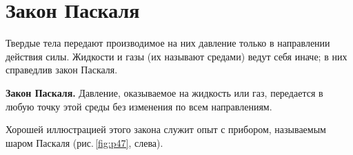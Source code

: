 \documentclass[main.tex]{subfiles}
\begin{document}

\pagestyle{empty}

 

\setcounter{section}{26
}
\addtocounter{section}{-1} 

\section{Закон Паскаля}


Твердые тела передают производимое на них давление только в направлении действия силы. Жидкости и газы (их называют средами) ведут себя иначе; в них справедлив закон Паскаля. 
\begin{law}
\textbf{Закон Паскаля.} Давление, оказываемое на жидкость или газ, передается в любую точку этой
среды без изменения по всем направлениям.
\end{law}
Хорошей иллюстрацией этого закона служит опыт с прибором, называемым шаром Паскаля (рис.\,\ref{fig:p47}, слева).
\end{document}
